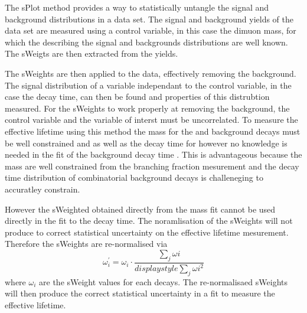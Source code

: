 The sPlot method provides a way to statistically untangle the signal and background distributions in a data set. %
The signal and background yields of the data set are measured using a control variable, in this case the dimuon mass, for which the \pdfs describing the signal and backgrounds distributions are well known. The sWeigts are then extracted from the yields.



The sWeights are then applied to the data, effectively removing the background. The signal distribution of a variable independant to the control variable, in the case the decay time, can then be found and properties of this distrubtion measured. For the sWeights to work properly at removing the background, the control variable and the variable of interst must be uncorrelated.
 To measure the \bsmumu effective lifetime using this method the mass \pdfs for the \bsmumu and background decays must be well constrained and as well as the decay time \pdf for \bsmumu however no knowledge is needed in the fit of the background decay time \pdf. This is advantageous because the mass \pdfs are well constrained from the branching fraction mesurement and the decay time distribution of combinatorial background decays is challeneging to accuratley constrain. 

However the sWeighted obtained directly from the mass fit cannot be used directly in the \ml fit to the decay time. The noramlisation of the sWeights will not produce to correct statistical uncertainty on the effective lifetime mesurement. Therefore the sWeights are re-normalised via
\begin{equation}
\omega^{'}_{i}= \omega_{i} \cdot \frac{\displaystyle\sum_{j} \omega{i}}{displaystyle\sum_{j} \omega{i}^{2}}
\end{equation}
where $\omega_{i}$ are the sWeight values for each decays. The re-normalisaed sWeights will then produce the correct statistical uncertainty in a \ml fit to measure the \bsmumu effective lifetime.

